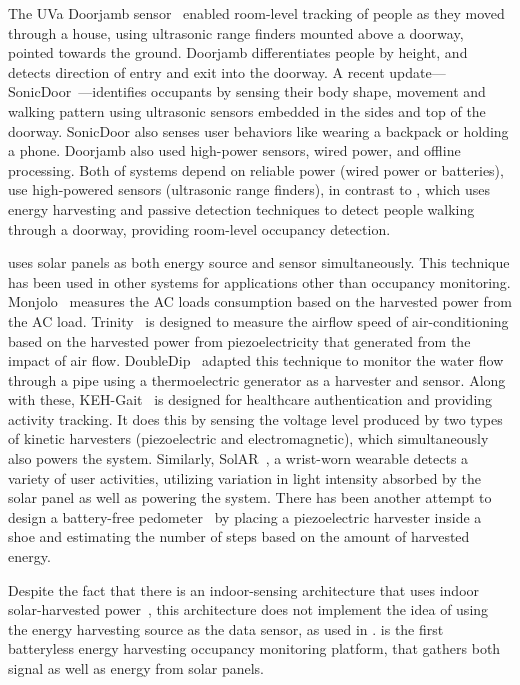 The UVa Doorjamb sensor~\cite{hnat2012doorjamb} enabled room-level tracking of people as they moved through a house, using ultrasonic range finders mounted above a doorway, pointed towards the ground. Doorjamb differentiates people by height, and detects direction of entry and exit into the doorway. 
A recent update---SonicDoor~\cite{sonicdoor-buildsys2017}---identifies occupants by sensing their body shape, movement and walking pattern using ultrasonic sensors embedded in the sides and top of the doorway. SonicDoor also senses user behaviors like wearing a backpack or holding a phone.
Doorjamb also used high-power sensors, wired power, and offline processing.
Both of systems depend on reliable power (wired power or batteries), use high-powered sensors (ultrasonic range finders), in contrast to \sysname, which uses energy harvesting and passive detection techniques to detect people walking through a doorway, providing room-level occupancy detection.

 \sysname uses solar panels as both energy source and sensor simultaneously. This technique has been used in other systems for applications other than occupancy monitoring. Monjolo~\cite{debruin2013monjolo} measures the AC loads consumption based on the harvested power from the AC load. Trinity~\cite{xiang2013powering} is designed to measure the airflow speed of air-conditioning based on the harvested power from piezoelectricity that generated from the impact of air flow. DoubleDip~\cite{martin2012doubledip} adapted this technique to monitor the water flow through a pipe using a thermoelectric generator as a harvester and sensor. Along with these, KEH-Gait~\cite{xu2017keh} is designed for healthcare authentication and providing activity tracking. It does this by sensing the voltage level produced by two types of kinetic harvesters (piezoelectric and electromagnetic), which simultaneously also powers the system.  Similarly, SolAR~\cite{sandhu2021solar}, a wrist-worn wearable detects a variety of user activities, utilizing variation in light intensity absorbed by the solar panel as well as powering the system. There has been another attempt to design a battery-free pedometer~\cite{kalantarian2016pedometers} by placing a piezoelectric harvester inside a shoe and estimating the number of steps based on the amount of harvested energy.  

Despite the fact that there is an indoor-sensing architecture that uses indoor solar-harvested power~\cite{campbell2014energy}, this architecture does not implement the idea of using the energy harvesting source as the data sensor, as used in \sysname.
\sysname is the first batteryless energy harvesting occupancy monitoring platform, that gathers both signal as well as energy from solar panels.

